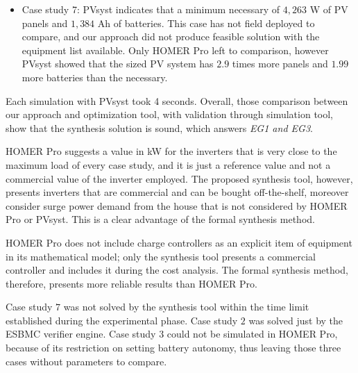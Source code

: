 \documentclass[runningheads]{llncs}
\begin{document}
\begin{itemize}
	\item Case study 7: PVsyst indicates that a minimum necessary of $4,263$ W of PV panels and $1,384$ Ah of batteries. This case has not field deployed to compare, and our approach did not produce feasible solution with the equipment list available. Only HOMER Pro left to comparison, however PVsyst showed that the sized PV system has $2.9$ times more panels and $1.99$ more batteries than the necessary.
\end{itemize}  

Each simulation with PVsyst took 4 seconds. Overall, those comparison between our approach and optimization tool, with validation through simulation tool, show that the synthesis solution is sound, which answers \textit{EG1 and EG3}.


HOMER Pro suggests a value in kW for the inverters that is very close to the maximum load of every case study, and it is just a reference value and not a commercial value of the inverter employed. The proposed synthesis tool, however, presents inverters that are commercial and can be bought off-the-shelf, moreover consider surge power demand from the house that is not considered by HOMER Pro or PVsyst. This is a clear advantage of the formal synthesis method.

HOMER Pro does not include charge controllers as an explicit item of equipment in its mathematical model; only the synthesis tool presents a commercial controller and includes it during the cost analysis. The formal synthesis method, therefore, presents more reliable results than HOMER Pro.

Case study $7$ was not solved by the synthesis tool within the time limit established during the experimental phase. Case study $2$ was solved just by the ESBMC verifier engine. Case study $3$ could not be simulated in HOMER Pro, because of its restriction on setting battery autonomy, thus leaving those three cases without parameters to compare.
\end{document}

